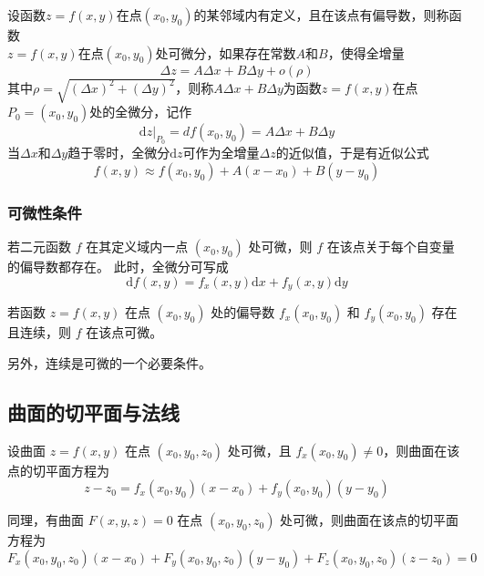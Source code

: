 \begin{definition}
    设函数$z=f(x,y)$在点$(x_0,y_0)$的某邻域内有定义，且在该点有偏导数，则称函数\\$z=f(x,y)$在点$(x_0,y_0)$处可微分，如果存在常数$A$和$B$，使得全增量
        \[
            \Delta z=A\Delta x+B\Delta y+o(\rho)
        \]
        其中$\rho=\sqrt{(\Delta x)^2+(\Delta y)^2}$，则称$A\Delta x+B\Delta y$为函数$z=f(x,y)$在点$P_0=(x_0,y_0)$处的全微分，记作
        \[
            \left.\mathrm{d}z\right|_{P_0}=df(x_0,y_0)=A\Delta x+B\Delta y
        \]
        当$\Delta x$和$\Delta y$趋于零时，全微分$\mathrm{d}z$可作为全增量$\Delta z$的近似值，于是有近似公式
    \[
        f(x,y)\approx f(x_0,y_0)+A(x-x_0)+B(y-y_0)
    \]
\end{definition}

\subsubsection{可微性条件}


\begin{theorem}
    若二元函数 $f$ 在其定义域内一点 $(x_0,y_0)$ 处可微，则 $f$ 在该点关于每个自变量的偏导数都存在。
    此时，全微分可写成
    \[
        \mathrm{d}f(x,y)=f_x(x,y)\mathrm{d}x+f_y(x,y)\mathrm{d}y
    \]
\end{theorem}

\begin{theorem}[可微的充分条件]
    若函数 $z=f(x,y)$ 在点 $(x_0,y_0)$ 处的偏导数 $f_x(x_0,y_0)$ 和 $f_y(x_0,y_0)$ 存在且连续，则 $f$ 在该点可微。
\end{theorem}

另外，连续是可微的一个必要条件。

\subsection{曲面的切平面与法线}

\begin{definition}
    设曲面 $z=f(x,y)$ 在点 $(x_0,y_0,z_0)$ 处可微，且 $f_x(x_0,y_0)\neq 0$，则曲面在该点的切平面方程为
    \[
        z-z_0=f_x(x_0,y_0)(x-x_0)+f_y(x_0,y_0)(y-y_0)
    \]
\end{definition}

同理，有曲面 $F(x,y,z)=0$ 在点 $(x_0,y_0,z_0)$ 处可微，则曲面在该点的切平面方程为
\[
    F_x(x_0,y_0,z_0)(x-x_0)+F_y(x_0,y_0,z_0)(y-y_0)+F_z(x_0,y_0,z_0)(z-z_0)=0
\]

